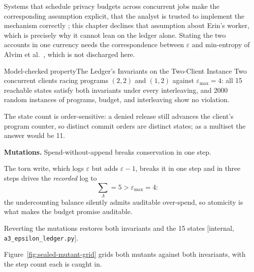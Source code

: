 \documentclass[11pt,a4paper]{article}
\theoremstyle{definition}
\begin{document}


Systems that schedule privacy budgets across concurrent jobs make the
corresponding assumption explicit, that the analyst is trusted to implement
the mechanism correctly ; this chapter declines that assumption
about Erin's worker, which is precisely why it cannot lean on the ledger alone.
Stating the two accounts in one currency needs the correspondence between
$\varepsilon$ and min-entropy of Alvim et al.\ , which is not
discharged here.

\begin{pdclaim}{Model-checked property}{The Ledger's Invariants on the Two-Client Instance}
\label{prop:sealed-ledger-checked}
\setlength{\parskip}{4pt plus 1pt}
Two concurrent clients racing programs $(2,2)$ and $(1,2)$ against
$\varepsilon_{\max}=4$: all 15 reachable states satisfy both invariants under
every interleaving, and 2000 random instances of programs, budget, and
interleaving show no violation.

The state count is order-sensitive: a denied
release still advances the client's program counter, so distinct commit orders
are distinct states; as a multiset the answer would be 11.

{
\textbf{Mutations.}
Spend-without-append breaks conservation in one step.\par}

The torn write, which
logs $\varepsilon$ but adds $\varepsilon-1$, breaks it in one step and in three
steps drives the \emph{recorded} log to \[
\sum_\Lambda=5>\varepsilon_{\max}=4:
\]
the undercounting balance silently admits auditable over-spend, so atomicity
is what makes the budget promise auditable.

Reverting the mutations restores
both invariants and the 15 states [internal, \texttt{a3\_epsilon\_ledger.py}].
\end{pdclaim}

Figure~\ref{fig:sealed-mutant-grid} grids both mutants against both
invariants, with the step count each is caught in.


\end{document}

